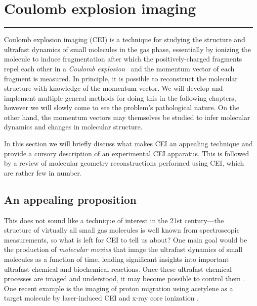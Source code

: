 \chapter{Coulomb explosion imaging}\label{ch:CEI}

\vspace{-1.5 em}
\begin{addmargin}[-0.5cm]{0cm}
  \minitoc
\end{addmargin}
\hrule
\vspace{1.5 em}

Coulomb explosion imaging (CEI) is a technique for studying the structure and ultrafast dynamics of small molecules in the gas phase, essentially by ionizing the molecule to induce fragmentation after which the positively-charged fragments repel each other in a \emph{Coulomb explosion}\footnotemark~ and the momentum vector of each fragment is measured. In principle, it is possible to reconstruct the molecular structure with knowledge of the momentum vector. We will develop and implement multiple general methods for doing this in the following chapters, however we will slowly come to see the problem's pathological nature. On the other hand, the momentum vectors may themselves be studied to infer molecular dynamics and changes in molecular structure.


In this section we will briefly discuss what makes CEI an appealing technique and provide a cursory description of an experimental CEI apparatus. This is followed by a review of molecular geometry reconstructions performed using CEI, which are rather few in number.

\section{An appealing proposition}
This does not sound like a technique of interest in the 21st century---the structure of virtually all small gas molecules is well known from spectroscopic measurements, so what is left for CEI to tell us about? One main goal would be the production of \emph{molecular movies} that image the ultrafast dynamics of small molecules as a function of time, lending significant insights into important ultrafast chemical and biochemical reactions. Once these ultrafast chemical processes are imaged and understood, it may become possible to control them \citep{Miller10,Zewail00,Weinstein12}. One recent example is the imaging of proton migration using acetylene as a target molecule by laser-induced CEI \citep{Ibrahim14} and x-ray core ionization \citep{Liekhus-Schmaltz15}.

